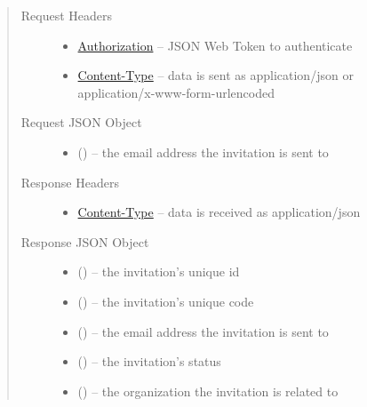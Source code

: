\documentclass[letterpaper,10pt,english]{sphinxmanual}
\begin{document}
\begin{fulllineitems}
\begin{quote}
\begin{description}
\item[{Request Headers}] \leavevmode\begin{itemize}
\item {} 
\href{http://tools.ietf.org/html/rfc7235\#section-4.2}{Authorization} -- JSON Web Token to authenticate

\item {} 
\href{http://tools.ietf.org/html/rfc7231\#section-3.1.1.5}{Content-Type} -- data is sent as application/json or
application/x-www-form-urlencoded

\end{itemize}

\item[{Request JSON Object}] \leavevmode\begin{itemize}
\item {} 
 () -- the email address the invitation is sent to

\end{itemize}

\item[{Response Headers}] \leavevmode\begin{itemize}
\item {} 
\href{http://tools.ietf.org/html/rfc7231\#section-3.1.1.5}{Content-Type} -- data is received as application/json

\end{itemize}

\item[{Response JSON Object}] \leavevmode\begin{itemize}
\item {} 
 () -- the invitation's unique id

\item {} 
 () -- the invitation's unique code

\item {} 
 () -- the email address the invitation is sent to

\item {} 
 () -- the invitation's status

\item {} 
 () -- the organization the invitation is related
to


\end{itemize}
\end{description}
\end{quote}
\end{fulllineitems}
\end{document}
